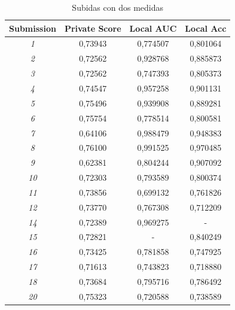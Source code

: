 \begin{table}[H]
\centering
\begin{tabular}{|c|c|c|c|}
\hline
\textbf{Submission} & \textbf{Private Score}         & \textbf{Local AUC} & \textbf{Local Acc} \\ \hline
\textit{1}          & {\color[HTML]{134F5C} 0,73943} & 0,774507           & 0,801064           \\ \hline
\textit{2}          & {\color[HTML]{134F5C} 0,72562} & 0,928768           & 0,885873           \\ \hline
\textit{3}          & {\color[HTML]{134F5C} 0,72562} & 0,747393           & 0,805373           \\ \hline
\textit{4}          & {\color[HTML]{134F5C} 0,74547} & 0,957258           & 0,901131           \\ \hline
\textit{5}          & {\color[HTML]{134F5C} 0,75496} & 0,939908           & 0,889281           \\ \hline
\textit{6}          & {\color[HTML]{134F5C} 0,75754} & 0,778514           & 0,800581           \\ \hline
\textit{7}          & {\color[HTML]{134F5C} 0,64106} & 0,988479           & 0,948383           \\ \hline
\textit{8}          & {\color[HTML]{00F000} 0,76100}    & 0,991525           & 0,970485           \\ \hline
\textit{9}          & {\color[HTML]{F00000} 0,62381}    & 0,804244           & 0,907092           \\ \hline
\textit{10}         & {\color[HTML]{134F5C} 0,72303} & 0,793589           & 0,800374           \\ \hline
\textit{11}         & {\color[HTML]{134F5C} 0,73856} & 0,699132           & 0,761826           \\ \hline
\textit{12}         & {\color[HTML]{134F5C} 0,73770} & 0,767308           & 0,712209           \\ \hline
\textit{14}         & {\color[HTML]{134F5C} 0,72389} & 0,969275           & -                  \\ \hline
\textit{15}         & {\color[HTML]{134F5C} 0,72821} & -                  & 0,840249           \\ \hline
\textit{16}         & {\color[HTML]{134F5C} 0,73425} & 0,781858           & 0,747925           \\ \hline
\textit{17}         & {\color[HTML]{134F5C} 0,71613} & 0,743823           & 0,718880           \\ \hline
\textit{18}         & {\color[HTML]{134F5C} 0,73684} & 0,795716           & 0,786492           \\ \hline
\textit{20}         & {\color[HTML]{134F5C} 0,75323} & 0,720588           & 0,738589           \\ \hline
\end{tabular}
\caption{Subidas con dos medidas}
\end{table}

